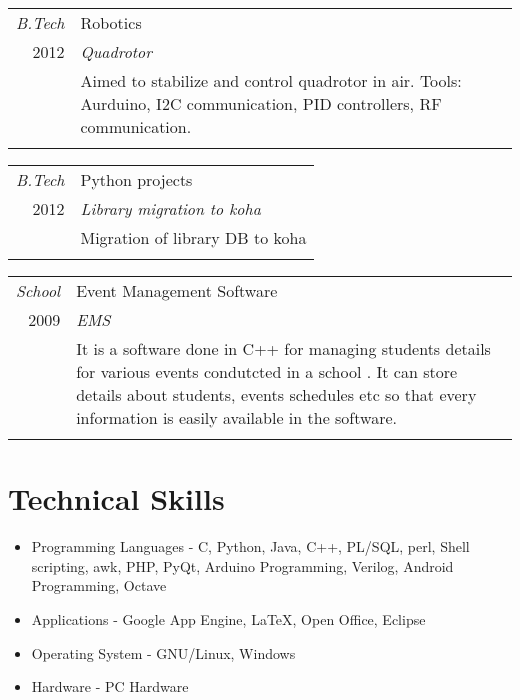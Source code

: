 \documentclass[a4paper]{article}
\begin{document}
\begin{tabular}{r|p{15cm}}
\emph{B.Tech} & Robotics \\
\textsc{2012} & \emph{Quadrotor} \\
& \normalsize {Aimed to stabilize and control quadrotor in air. Tools: Aurduino, I2C communication,
PID controllers, RF communication.}\\
\multicolumn{2}{c}{}\ %
\end{tabular}

\begin{tabular}{r|p{15cm}}
\emph{B.Tech} & Python projects \\
\textsc{2012} & \emph{Library migration to koha } \\
& \normalsize {Migration of library DB to koha}\\
\multicolumn{2}{c}{}\ %
\end{tabular}



\begin{tabular}{r|p{15cm}}
\emph{School } & Event Management Software \\
\textsc{2009 } & \emph{EMS } \\
& \normalsize {It is a software done in C++ for managing students details for various events condutcted in a school . It can store details about students, events schedules etc so that every information is easily available in the software.
}\\

\multicolumn{2}{c}{}\ %
\end{tabular}


\section{Technical Skills}
\begin{itemize}
\item Programming Languages -  C, Python, Java, C++,  PL/SQL, perl, Shell scripting, awk, PHP, PyQt, Arduino Programming, Verilog,  Android Programming, Octave
\item Applications - Google App Engine, \LaTeX, Open Office, Eclipse
\item Operating System - GNU/Linux, Windows  
\item Hardware - PC Hardware
\end{itemize}
\end{document}
